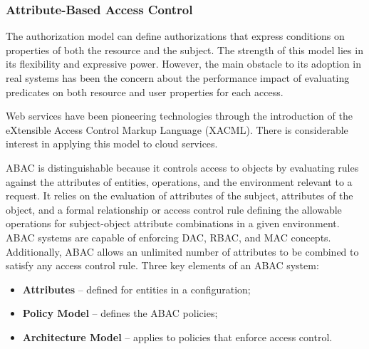 \documentclass{article}
\begin{document}
        \subsubsection{Attribute-Based Access Control}
        The authorization model can define authorizations that express conditions on properties of both the resource and the subject. The strength of this model lies in its flexibility and expressive power. However, the main obstacle to its adoption in real systems has been the concern about the performance impact of evaluating predicates on both resource and user properties for each access. 

Web services have been pioneering technologies through the introduction of the eXtensible Access Control Markup Language (XACML). There is considerable interest in applying this model to cloud services.

ABAC is distinguishable because it controls access to objects by evaluating rules against the attributes of entities, operations, and the environment relevant to a request. It relies on the evaluation of attributes of the subject, attributes of the object, and a formal relationship or access control rule defining the allowable operations for subject-object attribute combinations in a given environment. ABAC systems are capable of enforcing DAC, RBAC, and MAC concepts. Additionally, ABAC allows an unlimited number of attributes to be combined to satisfy any access control rule.
Three key elements of an ABAC system:
\begin{itemize}
    \item \textbf{Attributes} – defined for entities in a configuration;
    \item \textbf{Policy Model} – defines the ABAC policies;
    \item \textbf{Architecture Model} – applies to policies that enforce access control.
\end{itemize}
\end{document}
